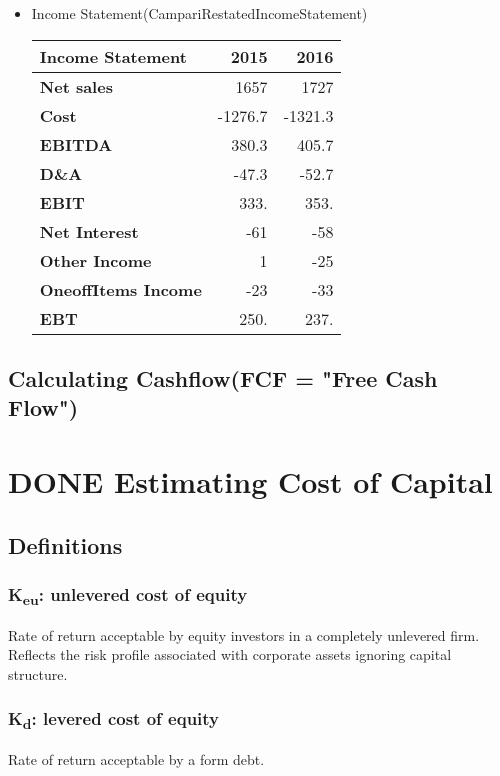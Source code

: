 \documentclass[11pt]{article}
\begin{document}
\begin{itemize}
\begin{itemize}
\item Income Statement(CampariRestatedIncomeStatement)
\label{sec:org09e3184}
\begin{table}[htbp]
\label{CampariRestatedIncomeStatement}
\centering
\begin{tabular}{lrr}
\textbf{Income Statement} & 2015 & 2016\\
\hline
\textbf{Net sales} & 1657 & 1727\\
\hline
\textbf{Cost} & -1276.7 & -1321.3\\
\hline
\textbf{EBITDA} & 380.3 & 405.7\\
\hline
\textbf{D\&A} & -47.3 & -52.7\\
\hline
\textbf{EBIT} & 333. & 353.\\
\hline
\textbf{Net Interest} & -61 & -58\\
\hline
\textbf{Other Income} & 1 & -25\\
\hline
\textbf{OneoffItems Income} & -23 & -33\\
\hline
\textbf{EBT} & 250. & 237.\\
\hline
\end{tabular}
\end{table}
\end{itemize}
\end{itemize}

\subsection*{Calculating Cashflow(FCF = "Free Cash Flow")}
\label{sec:org9cfadea}

\section*{{\bfseries\sffamily DONE} Estimating Cost of Capital}
\label{sec:orgbb5f683}
\subsection*{Definitions}
\label{sec:org7b4b052}
\subsubsection*{K\textsubscript{eu}: unlevered cost of equity}
\label{sec:orga2225c2}
Rate of return acceptable by equity investors in a completely unlevered firm. Reflects the risk profile associated with corporate assets ignoring capital structure.\\
\subsubsection*{K\textsubscript{d}: levered cost of equity}
\label{sec:org389c440}
Rate of return acceptable by a form debt.\\
\end{document}
